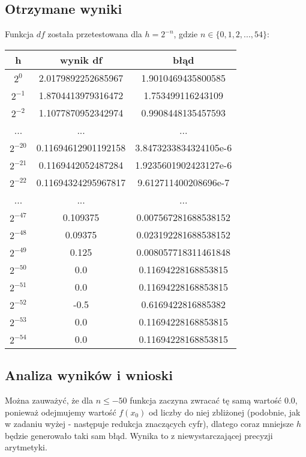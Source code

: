 \documentclass[11pt]{article}
\theoremstyle{remark}
\begin{document}
\subsection{Otrzymane wyniki}
Funkcja $df$ została przetestowana dla $h=2^{-n}$, gdzie $n \in \{0, 1, 2, ..., 54\}$:
\begin{center}
\begin{tabular}{ |c|c|c| } 
 \hline
 h & wynik df & błąd \\ 
  \hline
 $2^0$ & 2.0179892252685967 &  1.9010469435800585\\ 
 $2^{-1}$ & 1.8704413979316472 & 1.753499116243109 \\
 $2^{-2}$ & 1.1077870952342974 &  0.9908448135457593 \\
 ... & ... & ... \\
 $2^{-20}$ & 0.11694612901192158 & 3.8473233834324105e-6 \\
 $2^{-21}$ & 0.1169442052487284 & 1.9235601902423127e-6 \\
 $2^{-22}$ & 0.11694324295967817 & 9.612711400208696e-7 \\
 ... & ... & ... \\
 $2^{-47}$ & 0.109375 & 0.007567281688538152 \\
 $2^{-48}$ & 0.09375 & 0.023192281688538152 \\
 $2^{-49}$ & 0.125 & 0.008057718311461848 \\
 $2^{-50}$ & 0.0 & 0.11694228168853815 \\
 $2^{-51}$ & 0.0 & 0.11694228168853815 \\
 $2^{-52}$ & -0.5 & 0.6169422816885382 \\
 $2^{-53}$ & 0.0 & 0.11694228168853815 \\
 $2^{-54}$ & 0.0 & 0.11694228168853815 \\
 \hline
\end{tabular}
\end{center}
\subsection{Analiza wyników i wnioski}
Można zauważyć, że dla $n\leq-50$ funkcja zaczyna zwracać tę samą wartość 0.0, ponieważ odejmujemy wartość $f(x_0)$ od liczby do niej zbliżonej (podobnie, jak w zadaniu wyżej - następuje redukcja znaczących cyfr), dlatego coraz mniejsze $h$ będzie generowało taki sam błąd. Wynika to z niewystarczającej precyzji arytmetyki.
\end{document}
